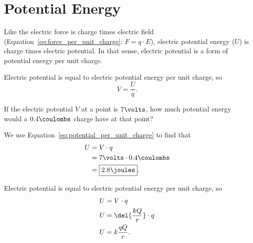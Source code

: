 \documentclass[12pt,paper=letter]{scrartcl}
\begin{document}
    \section{Potential Energy}\label{sec:potential-energy}

    Like the electric force is charge times electric field (Equation~\ref{eq:force_per_unit_charge}: $F=q\cdot E$),
    electric potential energy ($U$) is charge times electric potential.
    In that sense, electric potential is a form of potential energy per unit charge.

    \begin{thmboxed}
        Electric potential is equal to electric potential energy per unit charge,
        so
        \begin{equation}
            V=\frac{U}{q}.
            \label{eq:potential_per_unit_charge}
        \end{equation}
    \end{thmboxed}

    \begin{exboxed}
        If the electric potential $V$ at a point is $7 \volts$,
        how much potential energy would a $0.4 \coulombs$ charge have at that point?
    \end{exboxed}

    We use Equation~\ref{eq:potential_per_unit_charge} to find that
    \begin{align*}
        U &= V\cdot q\\
        &= 7 \volts \cdot 0.4 \coulombs\\
        &= \boxed{2.8 \joules}.
    \end{align*}

    \pagebreak[2]
    \begin{thmboxed}
        Electric potential is equal to electric potential energy per unit charge,
        so
        \begin{align*}
            U &= V\cdot q\\
            U &= \del{\frac{kQ}{r}}\cdot q\\
            U &= k\frac{qQ}{r}.
        \end{align*}
    \end{thmboxed}
\end{document}
